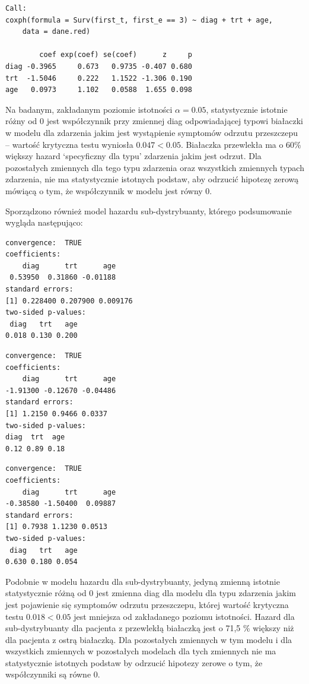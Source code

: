 \documentclass[]{article}
\begin{document}
\begin{verbatim}
Call:
coxph(formula = Surv(first_t, first_e == 3) ~ diag + trt + age, 
    data = dane.red)

        coef exp(coef) se(coef)      z     p
diag -0.3965     0.673   0.9735 -0.407 0.680
trt  -1.5046     0.222   1.1522 -1.306 0.190
age   0.0973     1.102   0.0588  1.655 0.098
\end{verbatim}

Na badanym, zakładanym poziomie istotności $\alpha=0.05$, statystycznie
istotnie różny od 0 jest współczynnik przy zmiennej \textsf{diag}
odpowiadającej typowi białaczki w modelu dla zdarzenia jakim jest
wystąpienie symptomów odrzutu przeszczepu -- wartość krytyczna testu
wyniosła $0.047<0.05$. Białaczka przewlekła ma o 60\% większy hazard
`specyficzny dla typu' zdarzenia jakim jest odrzut. Dla pozostałych
zmiennych dla tego typu zdarzenia oraz wszystkich zmiennych
 typach zdarzenia, nie ma statystycznie istotnych
podstaw, aby odrzucić hipotezę zerową mówiącą o tym, że współczynnik w
modelu jest równy 0.

Sporządzono również model hazardu sub-dystrybuanty, którego podsumowanie
wygląda następująco:

\begin{verbatim}
convergence:  TRUE 
coefficients:
    diag      trt      age 
 0.53950  0.31860 -0.01188 
standard errors:
[1] 0.228400 0.207900 0.009176
two-sided p-values:
 diag   trt   age 
0.018 0.130 0.200 
\end{verbatim}

\begin{verbatim}
convergence:  TRUE 
coefficients:
    diag      trt      age 
-1.91300 -0.12670 -0.04486 
standard errors:
[1] 1.2150 0.9466 0.0337
two-sided p-values:
diag  trt  age 
0.12 0.89 0.18 
\end{verbatim}

\begin{verbatim}
convergence:  TRUE 
coefficients:
    diag      trt      age 
-0.38580 -1.50400  0.09887 
standard errors:
[1] 0.7938 1.1230 0.0513
two-sided p-values:
 diag   trt   age 
0.630 0.180 0.054 
\end{verbatim}

Podobnie w modelu hazardu dla sub-dystrybuanty, jedyną zmienną istotnie
statystycznie różną od 0 jest zmienna \textsf{diag} dla modelu dla typu
zdarzenia jakim jest pojawienie się symptomów odrzutu przeszczepu,
której wartość krytyczna testu $0.018<0.05$ jest mniejsza od zakładanego
poziomu istotności. Hazard dla sub-dystrybuanty dla pacjenta z
przewlekłą białaczką jest o 71,5 \% większy niż dla pacjenta z ostrą
białaczką. Dla pozostałych zmiennych w tym modelu i dla wszystkich
zmiennych w pozostałych modelach dla tych zmiennych nie ma statystycznie
istotnych podstaw by odrzucić hipotezy zerowe o tym, że współczynniki są
równe 0.
\end{document}

